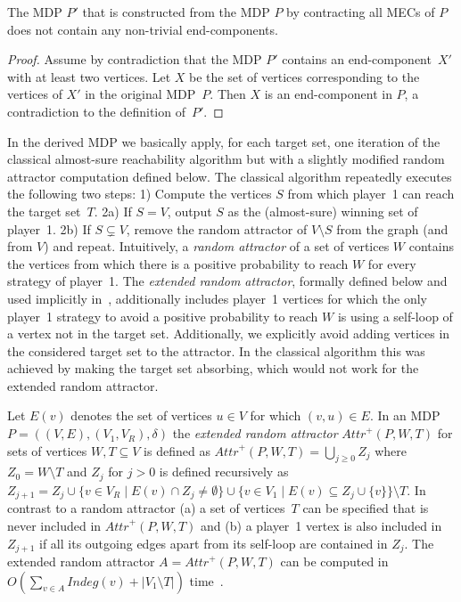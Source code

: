\documentclass[11pt,letterpaper]{article}
\newcommand{\set}[1]{\{#1\}}
\newcommand{\lu}{\textup{(}}
\newcommand{\ru}{\textup{)}\xspace}
\newcommand{\upbr}[1]{\lu #1\ru}
\newcommand{\ate}{\mathit{Attr}^+}
\newcommand{\mdp}{P\xspace}
\newcommand{\vo}{V_1\xspace}
\newcommand{\vr}{V_R\xspace}
\newcommand{\trans}{\delta\xspace}
\newcommand{\target}{T\xspace}
\newcommand{\ec}{X\xspace}
\newcommand{\InDeg}{\mathit{Indeg}}
\begin{document}
{\begin{observation}\label{obs:mecfree}
	The MDP $\mdp'$ that is constructed from the MDP $\mdp$ by contracting all 
	MECs of $\mdp$ does not contain any non-trivial end-components.
\end{observation}
\begin{proof}
Assume by contradiction that the MDP $\mdp'$ contains an end-component~$\ec'$ 
with at least two vertices. Let $\ec$ be the set of vertices corresponding 
to the vertices of $\ec'$ in the original MDP~$\mdp$. Then $\ec$ is an 
end-component in $\mdp$, a contradiction to the definition of~$\mdp'$.
\end{proof}

In the derived MDP we basically apply, for each target set,
one iteration of the classical almost-sure reachability algorithm but with a slightly
modified random attractor computation defined below. The classical algorithm
repeatedly executes the following two steps:
1) Compute the vertices $S$ from which player~1 can reach the target set~$\target$.
2a) If $S = V$, output $S$ as the (almost-sure) winning set of player~1.
2b) If $S \subsetneq V$, remove the random attractor of $V \setminus S$ 
from the graph (and from $V$) and repeat.
Intuitively, a \emph{random attractor} of a set of vertices $W$ contains the vertices
from which there is a positive probability to reach $W$ for every strategy of
player~1. The \emph{extended random attractor}, formally defined below
and used implicitly in~\cite{ChatterjeeH14}, additionally 
includes player~1 vertices for which the only player~1 strategy to avoid a 
positive probability to reach $W$ is using a self-loop of a vertex not in 
the target set.
Additionally, we explicitly avoid adding vertices in the considered target set 
to the attractor. In the classical algorithm this was achieved by making the 
target set absorbing, which would not work for the extended random attractor.

\begin{definition}\label{def:extattr}
Let $E(v)$ denotes the set of vertices $u \in V$
for which $(v, u) \in E$.
In an MDP $\mdp = ((V, E), (\vo, \vr), \trans)$ 
the \emph{extended random attractor} $\ate(\mdp, W, \target)$ for sets of vertices 
$W, \target \subseteq V$ is defined as $\ate(\mdp, W, \target) = \bigcup_{j \ge 0} Z_j$ 
where $Z_0 = W \setminus \target$ and 
$Z_j$ for $j > 0$ is defined recursively as $Z_{j+1} = Z_j \cup \set{v \in \vr 
\mid E(v) \cap Z_j \ne \emptyset} \cup \set{v \in \vo \mid E(v) \subseteq Z_j \cup
\set{v}} \setminus \target$. In contrast to a random attractor \upbr{a} a set of 
vertices~$\target$ can be specified that is never included in $\ate(\mdp, W, \target)$ 
and \upbr{b} a player~1 vertex is also included in $Z_{j+1}$ if all its outgoing 
edges apart from its self-loop are contained in $Z_j$.
The extended random attractor $A = \ate(\mdp, W, \target)$
can be computed in $O(\sum_{v \in 
A} \InDeg(v) + \lvert \vo \setminus \target \rvert)$ time~\cite{Beeri80,Immerman81}.
\end{definition}

}
\end{document}

